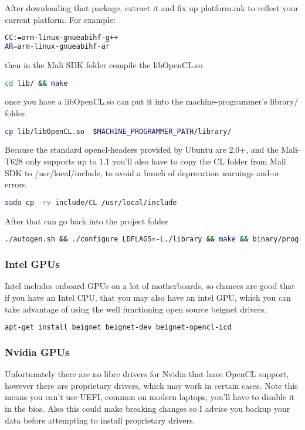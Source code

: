 \documentclass[12pt]{article}
\begin{document}
After downloading that package, extract it and fix up platform.mk to reflect
your current platform. For example:
\begin{lstlisting}[language=bash]
CC:=arm-linux-gnueabihf-g++
AR=arm-linux-gnueabihf-ar
\end{lstlisting}

then in the Mali SDK folder compile the libOpenCL.so
\begin{lstlisting}[language=bash]
cd lib/ && make
\end{lstlisting}
once you have a libOpenCL.so can put it into the machine-programmer's 
library/ folder.
\begin{lstlisting}[language=bash]
cp lib/libOpenCL.so  $MACHINE_PROGRAMMER_PATH/library/
\end{lstlisting}

Because the standard opencl-headers provided by Ubuntu are 2.0+, and the
Mali-T628 only supports up to 1.1 you'll also have to copy the CL folder 
from Mali SDK to /usr/local/include, to avoid a bunch of deprecation
warnings and-or errors.
\begin{lstlisting}[language=bash]
sudo cp -rv include/CL /usr/local/include
\end{lstlisting}

After that can go back into the project folder
\begin{lstlisting}[language=bash]
./autogen.sh && ./configure LDFLAGS=-L./library && make && binary/programmer
\end{lstlisting}

\subsubsection{Intel GPUs}
Intel includes onboard GPUs on a lot of motherboards, 
so chances are good that if you have an Intel CPU, that you may also have an
intel GPU, which you can take advantage of using the well functioning open
source beignet drivers.

\begin{lstlisting}[language=bash]
apt-get install beignet beignet-dev beignet-opencl-icd
\end{lstlisting}


\subsubsection{Nvidia GPUs}
Unfortunately there are no libre drivers for Nvidia that have OpenCL support,
however there are proprietary drivers, which may work in certain cases. 
Note this means you can't use UEFI, common on modern laptops, you'll have to
disable it in the bios.  Also this could make breaking changes so I advise you
backup your data before attempting to install proprietary drivers. 
\end{document}
